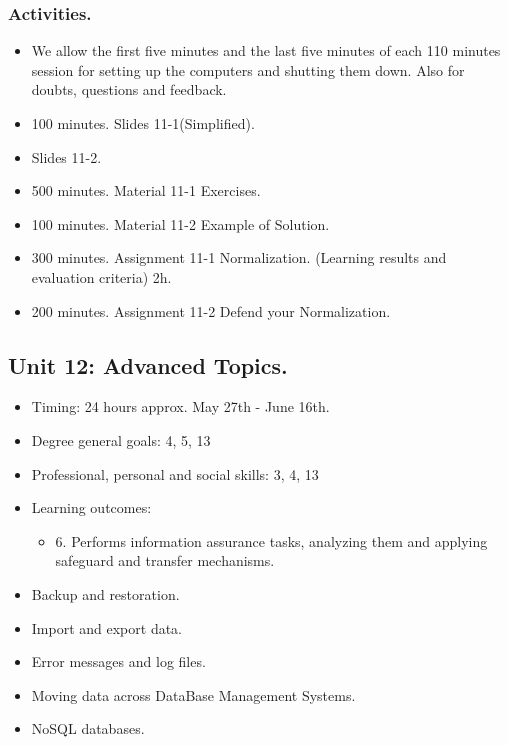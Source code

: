 \documentclass[catalan, a4paper, 12pt, titlepage]{article}
\begin{document}
  \subsubsection{Activities.}
  \begin{itemize}
          \item We allow the first five minutes and the last five minutes of each 110 minutes session for setting up the computers and shutting them down. Also for doubts, questions and feedback.
	  \item 100 minutes. Slides 11-1(Simplified).
	  \item Slides 11-2.
	  \item 500 minutes. Material 11-1 Exercises.
	  \item 100 minutes. Material 11-2 Example of Solution.
	  \item 300 minutes. Assignment 11-1 Normalization. (\faGraduationCap Learning results and evaluation criteria) 2h.
	  \item 200 minutes. Assignment 11-2 Defend your Normalization.
  \end{itemize}


  \subsection{Unit 12: Advanced Topics.}

  \begin{itemize}
	\item Timing: 24 hours approx. May 27th - June 16th.
	\item Degree general goals: 4, 5, 13
	\item Professional, personal and social skills: 3, 4, 13
	\item Learning outcomes: 
		\begin{itemize}
			\item 6. Performs information assurance tasks, analyzing them and applying safeguard and transfer mechanisms.
		\end{itemize}
  \end{itemize}

  \begin{itemize}
	\item Backup and restoration.
	\item Import and export data.
	\item Error messages and log files.
	\item Moving data across DataBase Management Systems.
	\item NoSQL databases.
  \end{itemize}
\end{document}

